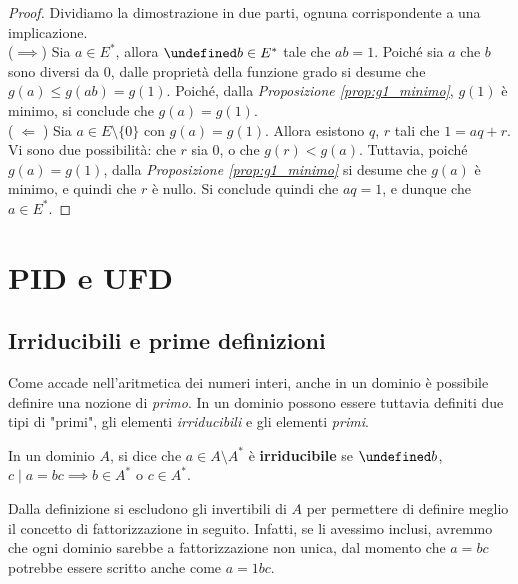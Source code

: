 \documentclass[a4paper]{article}
\let\oldexists\exists
\let\exists\undefined
\DeclareMathOperator{\exists}{\oldexists}
\begin{document}
\begin{proof}
    Dividiamo la dimostrazione in due parti, ognuna corrispondente a una implicazione. \\

    ($\implies$) \;Sia $a \in E^*$, allora $\exists b \in E^*$ tale che $ab=1$. Poiché
    sia $a$ che $b$ sono diversi da $0$, dalle proprietà della funzione grado si
    desume che $g(a) \leq g(ab) = g(1)$. Poiché, dalla \textit{Proposizione \ref{prop:g1_minimo}},
    $g(1)$ è minimo, si conclude che $g(a) = g(1)$. \\

    ($\;\Longleftarrow\;$) \;Sia $a \in E \setminus \{0\}$ con $g(a) = g(1)$. Allora
    esistono $q$, $r$ tali che $1 = aq + r$. Vi sono due possibilità: che $r$ sia $0$, o
    che $g(r) < g(a)$. Tuttavia, poiché $g(a)=g(1)$, dalla \textit{Proposizione \ref{prop:g1_minimo}} si desume che $g(a)$ è minimo, e quindi che
    $r$ è nullo. Si conclude quindi che $aq = 1$, e dunque che $a \in E^*$.
\end{proof}

\section{PID e UFD}

\subsection{Irriducibili e prime definizioni}

Come accade nell'aritmetica dei numeri interi, anche in un dominio è possibile definire
una nozione di \textit{primo}. In un dominio possono essere tuttavia definiti due tipi di "primi",
gli elementi \textit{irriducibili} e gli elementi \textit{primi}.

\begin{definition}
    In un dominio $A$, si dice che $a \in A \setminus A^*$ è \textbf{irriducibile} se
    $\exists b$, $c \mid a=bc \implies b \in A^*$ o $c \in A^*$.
\end{definition}

\begin{note}
    Dalla definizione si escludono gli invertibili di $A$ per permettere
    di definire meglio il concetto di fattorizzazione in seguito. Infatti,
    se li avessimo inclusi, avremmo che ogni dominio sarebbe a fattorizzazione
    non unica, dal momento che $a=bc$ potrebbe essere scritto anche come
    $a=1bc$.
\end{note}
\end{document}
